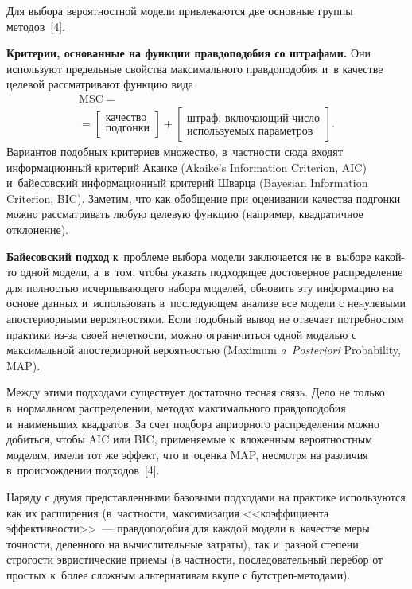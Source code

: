 \begin{multicols}{2}
     Для выбора вероятностной модели привлекаются две основные группы 
методов~[4].
     
     \textbf{Критерии, основанные на функции правдоподобия со 
штрафами.} Они используют предельные свойства максимального 
правдоподобия и~в качестве целевой рассматривают функцию вида
\begin{multline*}
\mathrm{MSC}= {}\\
     {}=\left[ \begin{array}{c}
     \mbox{качество}\\ 
     \mbox{подгонки}
     \end{array}
     \right] + \left[ \begin{array}{c}
     \mbox{штраф,\ включающий\ число}\\ 
     \mbox{используемых\ параметров}
     \end{array}
     \right].
     \end{multline*}
Вариантов подобных критериев множество, в~частности сюда входят 
информационный критерий Акаике (Akaike's Information Criterion, AIC) и~байесовский информационный 
критерий Шварца (Bayesian Information Criterion, BIC). Заметим, что как обобщение при оценивании качества 
подгонки можно рассматривать любую целевую функцию (например, 
квадратичное отклонение).

     \textbf{Байесовский подход} к~проб\-ле\-ме выбора модели заключается 
не в~выборе какой-то одной модели, а~в~том, чтобы указать подходящее 
достоверное распределение для полностью исчерпывающего набора моделей, 
обновить эту информацию на основе данных и~использовать в~последующем 
анализе все модели с ненулевыми апостериорными вероятностями. Если 
подобный вывод не отвечает потребностям практики из-за своей нечеткости, 
можно ограничиться одной моделью с максимальной апостериорной 
вероятностью (Maximum \textit{a~Posteriori} Probability, MAP). 
     
     Между этими подходами существует достаточно тесная связь. Дело не 
только в~нормальном распределении, методах максимального правдоподобия 
и~наименьших квадратов. За счет подбора априорного распределения можно 
добиться, чтобы AIC или BIC, применяемые к~вложенным вероятностным 
моделям, имели тот же эффект, что и~оценка MAP, несмотря на различия 
в~происхождении подходов~[4].
     
     Наряду с двумя представленными базовыми подходами на практике 
используются как их расширения (в~частности, максимизация <<коэффициента 
эффективности>>~--- правдоподобия для каждой модели в~качестве меры 
точности, деленного на вычислительные затраты), так и~разной степени 
строгости эвристические приемы (в частности, последовательный перебор от 
простых к~более сложным альтернативам вкупе с бут\-стреп-ме\-то\-дами). 
     

\end{multicols}
